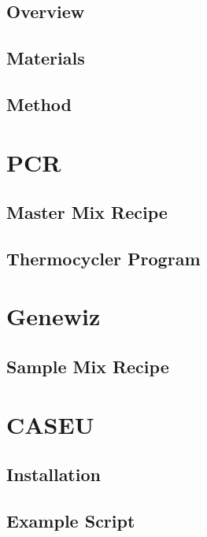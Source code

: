 \documentclass[onecolumn]{article}
\begin{document}
\subsection{Overview}

\subsection{Materials}

\subsection{Method}

\appendix
\section{PCR}\label{aA}
\subsection{Master Mix Recipe}

\subsection{Thermocycler Program}

\section{Genewiz}\label{aB}
\subsection{Sample Mix Recipe}

\section{CASEU}\label{aC}
\subsection{Installation}

\subsection{Example Script}



\end{document}
